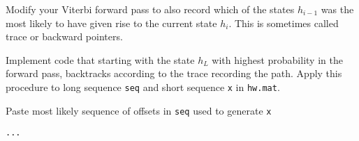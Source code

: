\documentclass{article}
\begin{document}
\newproblem{3pt} Modify your Viterbi forward pass to also record which of the states  $h_{i-1}$ was the most likely to have given rise to the current state $h_{i}$. This is sometimes called trace or backward pointers.

Implement code that starting with the state $h_L$ with highest probability in the forward pass, backtracks according to the trace recording the path. Apply this procedure to long sequence {\tt seq} and short sequence {\tt x} in {\tt hw\theHW.mat}.

Paste most likely sequence of offsets in {\tt seq} used to generate {\tt x}
\begin{verbatim}
...
\end{verbatim}
\end{document}
